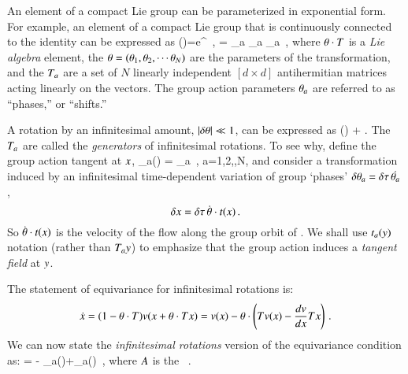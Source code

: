 An element of a compact Lie group can be parameterized in exponential form.
For example, an element of a compact Lie group that is continuously connected to the identity can be expressed as
\beq
\LieEl(\gSpace)=e^{{\gSpace} \cdot \Lg }
    \,,\qquad
\gSpace \cdot \Lg = \sum_a \gSpace_a \Lg_a
\,,
	\toCB
where $\gSpace \cdot \Lg $ is a \emph{Lie algebra} element, the $\gSpace = (\gSpace_1,\gSpace_2,\cdots\gSpace_N)$ are the parameters of the transformation, and the $\Lg_a$ are a set of $N$ linearly independent $[d\!\times\!d]$ antihermitian matrices acting linearly on the {\statesp} vectors. The group action parameters $\gSpace_a$ are referred to as ``phases,'' or ``shifts.''
%

A rotation by an infinitesimal amount, $|\delta \gSpace| \ll 1$, can be  expressed as
\beq
\LieEl(\delta \gSpace)  + \delta \gSpace \cdot \Lg.
The $\Lg_a$  are called the \emph{generators} of infinitesimal rotations. To see why, define the group action tangent at $\ssp$,
\beq
 \groupTan_{a}(\ssp) = \Lg _{a} \ssp
    \,,\qquad
 a=1,2,\cdots,N,
and consider a transformation induced by an infinitesimal
time-dependent variation of group `phases'
$\delta \gSpace_a = \timeStep \, \dot{\gSpace_a}$,
\[
\delta \ssp = \timeStep \, \dot{\gSpace} \cdot \groupTan(\ssp)
\,.
\]
So $\dot{{\bf \theta}} \cdot t(x)$ is the velocity
of the flow along the group orbit of \ssp.
We shall use $t_a(y)$ notation (rather than
$T_{a}y$) to emphasize that the group action
induces a \emph{tangent field} at $y$.

The statement of equivariance
 for infinitesimal rotations is:
\[
\dot{x}=(1-{\bf \theta} \cdot T ) v(x+{\bf \theta} \cdot T  x)
       =v(x)-{\bf \theta} \cdot \left(
            T v(x) - \frac{dv}{dx} T x
                     \right)
\,.
\]
We can now state the {\em infinitesimal
rotations} version of the equivariance condition
 as:
 = - \groupTan_{a}(\vel)+\Mvar \groupTan_{a}(\ssp)
\,,
\label{eq:InfnmslRot}
\eeq
where $A$ is the \stabmat\ .


